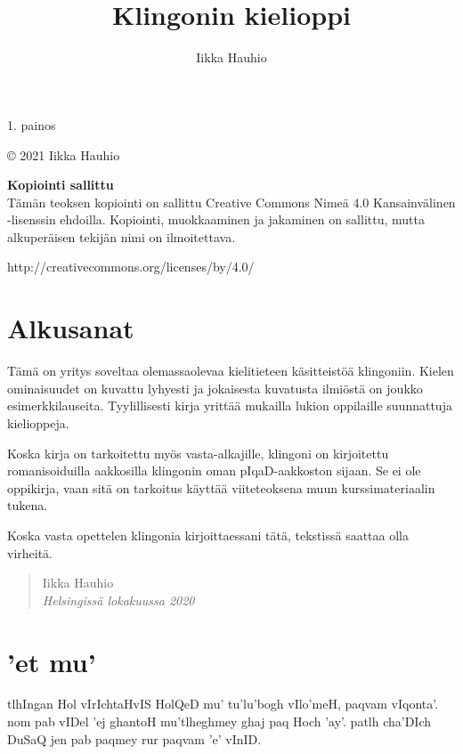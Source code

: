 \documentclass{book}
\title{{\pIqaD   }\\Klingonin kielioppi}
\author{Iikka Hauhio}
\begin{document}
\frontmatter

\maketitle

\newpage
\vspace*{\fill}
1. painos

© 2021 Iikka Hauhio


\textbf{Kopiointi sallittu} \\
Tämän teoksen kopiointi on sallittu Creative Commons Nimeä 4.0 Kansainvälinen -lisenssin ehdoilla.
Kopiointi, muokkaaminen ja jakaminen on sallittu, mutta alkuperäisen tekijän nimi on ilmoitettava.

http://creativecommons.org/licenses/by/4.0/

\chapter{Alkusanat}

Tämä on yritys soveltaa olemassaolevaa kielitieteen käsitteistöä klingoniin.
Kielen ominaisuudet on kuvattu lyhyesti ja jokaisesta kuvatusta ilmiöstä on joukko esimerkkilauseita.
Tyylillisesti kirja yrittää mukailla lukion oppilaille suunnattuja kielioppeja.

Koska kirja on tarkoitettu myös vasta-alkajille, klingoni on kirjoitettu romanisoiduilla aakkosilla klingonin oman pIqaD-aakkoston sijaan.
Se ei ole oppikirja, vaan sitä on tarkoitus käyttää viiteteoksena muun kurssimateriaalin tukena.

Koska vasta opettelen klingonia kirjoittaessani tätä, tekstissä saattaa olla virheitä.

\begin{quote}
    Iikka Hauhio \\
    \textit{Helsingissä lokakuussa 2020}
\end{quote}

\chapter{'et mu'}

tlhIngan Hol vIrIchtaHvIS HolQeD mu' tu'lu'bogh vIlo'meH, paqvam vIqonta'.
nom pab vIDel 'ej ghantoH mu'tlheghmey ghaj paq Hoch 'ay'.
patlh cha'DIch DuSaQ jen pab paqmey rur paqvam 'e' vInID.
\end{document}
